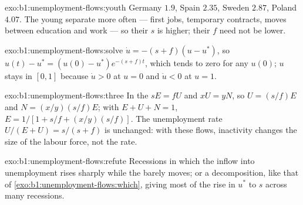 \begin{solution}{exo:b1:unemployment-flows:youth}
Germany $1.9$, Spain $2.35$, Sweden $2.87$, Poland $4.07$. The young separate
more often --- first jobs, temporary contracts, moves between education
and work --- so their $s$ is higher; their $f$ need not be lower.
\end{solution}

\begin{solution}{exo:b1:unemployment-flows:solve}
$\dot u = -(s + f)(u - u^*)$, so $u(t) - u^* = (u(0) - u^*)e^{-(s + f)t}$, which tends to zero for any $u(0)$; $u$
stays in $[0, 1]$ because $\dot u > 0$ at $u = 0$ and $\dot u < 0$ at $u = 1$.
\end{solution}

\begin{solution}{exo:b1:unemployment-flows:three}
In the  $sE = fU$ and $xU = yN$, so $U = (s/f)E$ and $N = (x/y)(s/f)E$; with
$E + U + N = 1$, $E = 1/[1 + s/f + (x/y)(s/f)]$. The unemployment rate $U/(E + U) = s/(s + f)$ is
unchanged: with these flows, inactivity changes the size of the labour
force, not the rate.
\end{solution}

\begin{solution}{exo:b1:unemployment-flows:refute}
Recessions in which the inflow into unemployment rises sharply while the
 barely moves; or a decomposition, like that of
\cref{exo:b1:unemployment-flows:which}, giving most of the rise in $u^*$ to $s$
across many recessions.
\end{solution}

